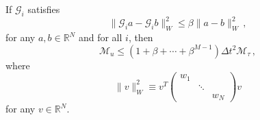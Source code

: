 \begin{theorem}
    If $\mathcal{G}_i$ satisfies
    \begin{equation}
        \|\mathcal{G}_ia-\mathcal{G}_ib\|^2_{W} \le \beta \|a-b\|^2_{W} \,,
        \label{eqn: contractive}
    \end{equation}
    for any $a, b \in \mathbb{R}^N$ and for all $i$,
    then 
    \begin{equation}
        \mathcal{M}_u \le \left(1+ \beta+ \cdots + \beta^{M-1}\right) \Delta t^2\mathcal{M}_{\tau}\,,
    \end{equation}
    where
    \begin{equation}
        \|v\|^2_{W} \equiv v^T 
            \begin{pmatrix}
                {w_{1}} && \\
                & \ddots & \\
                && {w_{N}}
            \end{pmatrix} v
    \end{equation}
    for any $v\in \mathbb{R}^N$.
    \label{theorem: 2}
\end{theorem}


